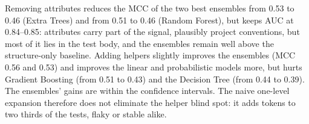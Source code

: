 Removing attributes reduces the MCC of the two best ensembles from 0.53 to 0.46 (Extra Trees) and from 0.51 to 0.46 (Random Forest), but keeps AUC at 0.84--0.85: attributes carry part of the signal, plausibly project conventions, but most of it lies in the test body, and the ensembles remain well above the structure-only baseline. Adding helpers slightly improves the ensembles (MCC 0.56 and 0.53) and improves the linear and probabilistic models more, but hurts Gradient Boosting (from 0.51 to 0.43) and the Decision Tree (from 0.44 to 0.39). The ensembles' gains are within the confidence intervals. The naive one-level expansion therefore does not eliminate the helper blind spot: it adds tokens to two thirds of the tests, flaky or stable alike.